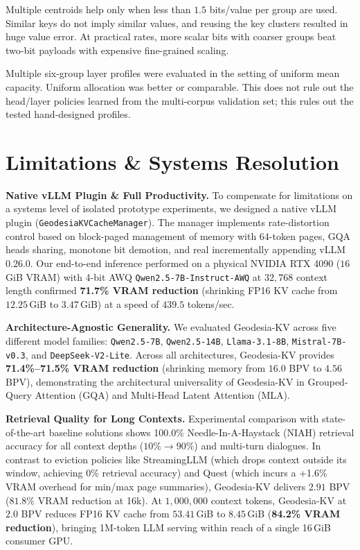 \documentclass[10pt,twocolumn]{article}
\newcommand{\method}{Geodesia-KV}
\newcommand{\bpv}{bits/value}
\begin{document}
\begin{paragraph}
Multiple centroids help only when less than $1.5$ \bpv{} per group are used. Similar keys do not imply similar values, and reusing the key clusters resulted in huge value error. At practical rates, more scalar bits with coarser groups beat two-bit payloads with expensive fine-grained scaling.

\end{paragraph}

\begin{paragraph}
Multiple six-group layer profiles were evaluated in the setting of uniform mean capacity. Uniform allocation was better or comparable. This does not rule out the head/layer policies learned from the multi-corpus validation set; this rules out the tested hand-designed profiles.

\end{paragraph}
\section{Limitations \& Systems Resolution}
\label{sec:limitations}

\textbf{Native vLLM Plugin \& Full Productivity.}
To compensate for limitations on a systems level of isolated prototype experiments, we designed a native vLLM plugin (\texttt{GeodesiaKVCacheManager}). The manager implements rate-distortion control based on block-paged management of memory with $64$-token pages, GQA heads sharing, monotone bit demotion, and real incrementally appending vLLM $0.26.0$. Our end-to-end inference performed on a physical NVIDIA RTX 4090 ($16$\,GiB VRAM) with 4-bit AWQ \texttt{Qwen2.5-7B-Instruct-AWQ} at $32,768$ context length confirmed \textbf{71.7\% VRAM reduction} (shrinking FP16 KV cache from $12.25$\,GiB to $3.47$\,GiB) at a speed of $439.5$ tokens/sec.

\textbf{Architecture-Agnostic Generality.}
We evaluated \method{} across five different model families: \texttt{Qwen2.5-7B}, \texttt{Qwen2.5-14B}, \texttt{Llama-3.1-8B}, \texttt{Mistral-7B-v0.3}, and \texttt{DeepSeek-V2-Lite}. Across all architectures, \method{} provides \textbf{71.4\%--71.5\% VRAM reduction} (shrinking memory from $16.0$ BPV to $4.56$ BPV), demonstrating the architectural universality of \method{} in Grouped-Query Attention (GQA) and Multi-Head Latent Attention (MLA).

\textbf{Retrieval Quality for Long Contexts.}
Experimental comparison with state-of-the-art baseline solutions shows 100.0\% Needle-In-A-Haystack (NIAH) retrieval accuracy for all context depths ($10\%\to90\%$) and multi-turn dialogues. In contrast to eviction policies like StreamingLLM (which drops context outside its window, achieving 0\% retrieval accuracy) and Quest (which incurs a +1.6\% VRAM overhead for min/max page summaries), \method{} delivers $2.91$ BPV ($81.8\%$ VRAM reduction at 16k). At $1,000,000$ context tokens, \method{} at $2.0$ BPV reduces FP16 KV cache from $53.41$\,GiB to $8.45$\,GiB (\textbf{84.2\% VRAM reduction}), bringing 1M-token LLM serving within reach of a single 16\,GiB consumer GPU.
\end{document}
